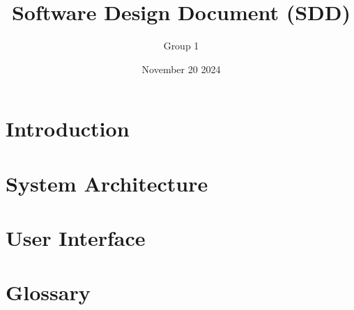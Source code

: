 \documentclass{article}
\title{Software Design Document (SDD)}
\author{Group 1 }
\date{November 20 2024}
\begin{document}
\maketitle  
\pagebreak

\tableofcontents
\pagebreak

\section{Introduction}


\section{System Architecture}
 
\section{User Interface}
 
\section{Glossary}
 

\end{document}
